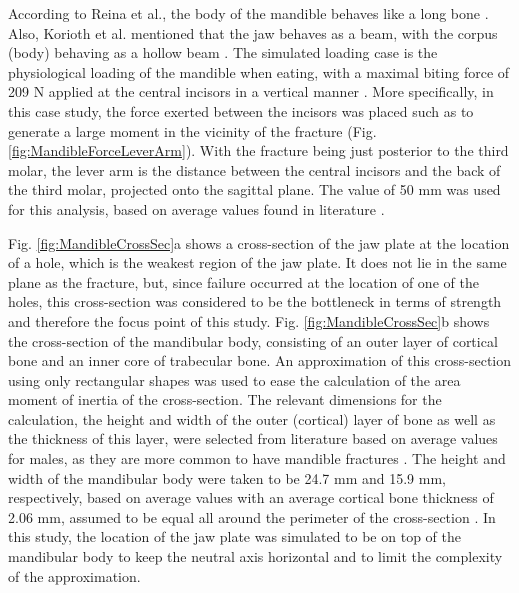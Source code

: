 According to Reina et al., the body of the mandible behaves like a long bone \cite{Reina}. Also, Korioth et al. mentioned that the jaw behaves as a beam, with the corpus (body) behaving as a hollow beam \cite{Korioth}. The simulated loading case is the physiological loading of the mandible when eating, with a maximal biting force of 209 N applied at the central incisors \cite{Mansour} in a vertical manner \cite{Reina}. More specifically, in this case study, the force exerted between the incisors was placed such as to generate a large moment in the vicinity of the fracture (Fig. \ref{fig:MandibleForceLeverArm}). With the fracture being just posterior to the third molar, the lever arm is the distance between the central incisors and the back of the third molar, projected onto the sagittal plane. The value of 50 mm was used for this analysis, based on average values found in literature \cite{akinbami}.

Fig. \ref{fig:MandibleCrossSec}a shows a cross-section of the jaw plate at the location of a hole, which is the weakest region of the jaw plate. It does not lie in the same plane as the fracture, but, since failure occurred at the location of one of the holes, this cross-section was considered to be the bottleneck in terms of strength and therefore the focus point of this study. Fig. \ref{fig:MandibleCrossSec}b shows the cross-section of the mandibular body, consisting of an outer layer of cortical bone and an inner core of trabecular bone. An approximation of this cross-section using only rectangular shapes was used to ease the calculation of the area moment of inertia of the cross-section. The relevant dimensions for the calculation, the height and width of the outer (cortical) layer of bone as well as the thickness of this layer, were selected from literature based on average values for males, as they are more common to have mandible fractures \cite{Bhavik}. The height and width of the mandibular body were taken to be 24.7 mm and 15.9 mm, respectively, based on average values \cite{Sittitavornwong, More} with an average cortical bone thickness of 2.06 mm, assumed to be equal all around the perimeter of the cross-section \cite{Katranji}. In this study, the location of the jaw plate was simulated to be on top of the mandibular body to keep the neutral axis horizontal and to limit the complexity of the approximation.

